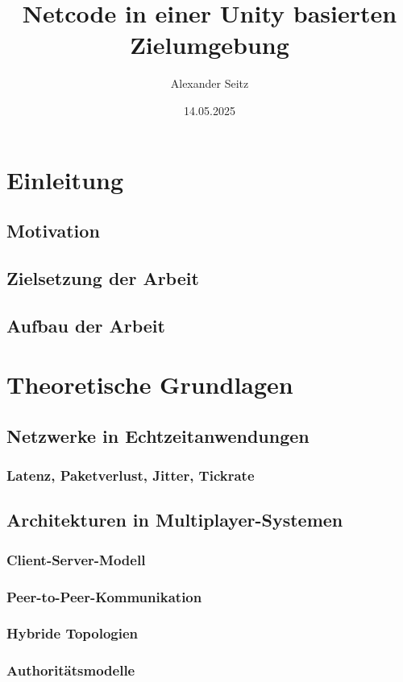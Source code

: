 \documentclass{article}
\title{Netcode in einer Unity basierten Zielumgebung}
\author{Alexander Seitz}
\date{14.05.2025}
\begin{document}
\maketitle
\tableofcontents
\newpage

\section{Einleitung}
\subsection{Motivation}
\subsection{Zielsetzung der Arbeit}
\subsection{Aufbau der Arbeit}

\section{Theoretische Grundlagen}
\subsection{Netzwerke in Echtzeitanwendungen}
\subsubsection{Latenz, Paketverlust, Jitter, Tickrate}
\subsection{Architekturen in Multiplayer-Systemen}
\subsubsection{Client-Server-Modell}
\subsubsection{Peer-to-Peer-Kommunikation}
\subsubsection{Hybride Topologien}
\subsubsection{Authoritätsmodelle}
\end{document}
